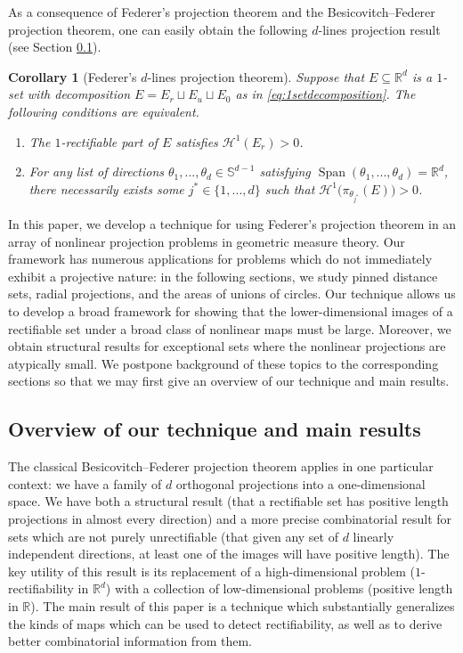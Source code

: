 \documentclass[12pt]{amsart}
\newtheorem{corollary}[theorem]{Corollary}
\theoremstyle{definition}
\numberwithin{equation}{section}
\DeclareMathOperator{\vspan}{Span}
\begin{document}
As a consequence of Federer's projection theorem and the Besicovitch--Federer projection theorem, one can easily obtain the following $d$-lines projection result (see Section \ref{sec:overview}).

\begin{corollary}[Federer's $d$-lines projection theorem]\label{thm:federerdlines}
    Suppose that $E \subseteq \mathbb{R}^d$ is a $1$-set with decomposition $E = E_r \sqcup E_u \sqcup E_0$ as in \eqref{eq:1setdecomposition}. The following conditions are equivalent.
    \begin{enumerate}[(1)]
        \item The $1$-rectifiable part of $E$ satisfies $\mathcal{H}^1 (E_r) > 0$.
        \medskip
        \item For any list of directions $\theta_1,...,\theta_d \in \mathbb{S}^{d-1}$ satisfying $\vspan (\theta_1,...,\theta_d) = \mathbb{R}^d$, there necessarily exists some $j^* \in \{1,...,d\}$ such that $\mathcal{H}^1\big(\pi_{\theta_{j^*}} (E)\big) > 0$.
\end{enumerate}
\end{corollary}

In this paper, we develop a technique for using Federer's projection theorem in an array of nonlinear projection problems in geometric measure theory. Our framework has numerous applications for problems which do not immediately exhibit a projective nature: in the following sections, we study pinned distance sets, radial projections, and the areas of unions of circles. Our technique allows us to develop a broad framework for showing that the lower-dimensional images of a rectifiable set under a broad class of nonlinear maps must be large. Moreover, we obtain structural results for exceptional sets where the nonlinear projections are atypically small. We postpone background of these topics to the corresponding sections so that we may first give an overview of our technique and main results. 

\subsection{Overview of our technique and main results} \label{sec:overview}

The classical Besicovitch--Federer projection theorem applies in one particular context: we have a family of $d$ orthogonal projections into a one-dimensional space. We have both a structural result (that a rectifiable set has positive length projections in almost every direction) and a more precise combinatorial result for sets which are not purely unrectifiable (that given any set of $d$ linearly independent directions, at least one of the images will have positive length). The key utility of this result is its replacement of a high-dimensional problem ($1$-rectifiability in $\mathbb{R}^d$) with a collection of low-dimensional problems (positive length in $\mathbb{R}$). The main result of this paper is a technique which substantially generalizes the kinds of maps which can be used to detect rectifiability, as well as to derive better combinatorial information from them. 
\end{document}
